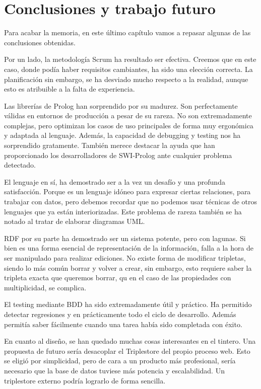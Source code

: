 \documentclass[12pt]{report} %
\begin{document}
\chapter{Conclusiones y trabajo futuro}

Para acabar la memoria, en este último capítulo vamos a repasar algunas de las conclusiones obtenidas.

Por un lado, la metodología Scrum ha resultado ser efectiva. Creemos que en este caso, donde podía haber requisitos cambiantes, ha sido una elección correcta. La planificación sin embargo, se ha desviado mucho respecto a la realidad, aunque esto es atribuible a la falta de experiencia.

Las librerías de Prolog han sorprendido por su madurez. Son perfectamente válidas en entornos de producción a pesar de su rareza. No son extremadamente complejas, pero optimizan los casos de uso principales de forma muy ergonómica y adaptada al lenguaje.  Además, la capacidad de debugging y testing nos ha sorprendido gratamente. También merece destacar la ayuda que han proporcionado los desarrolladores de SWI-Prolog ante cualquier problema detectado.

El lenguaje en sí, ha demostrado ser a la vez un desafío y una profunda satisfacción. Porque es un lenguaje idóneo para expresar ciertas relaciones, para trabajar con datos, pero debemos recordar que no podemos usar técnicas de otros lenguajes que ya están interiorizadas. Este problema de rareza también se ha notado al tratar de elaborar diagramas UML.

RDF por su parte ha demostrado ser un sistema potente, pero con lagunas. Si bien es una forma esencial de representación de la información, falla a la hora de ser manipulado para realizar ediciones. No existe forma de modificar tripletas, siendo lo más común borrar y volver a crear, sin embargo, esto requiere saber la tripleta exacta que queremos borrar, qu en el caso de las propiedades con multiplicidad, se complica.

El testing mediante BDD ha sido extremadamente útil y práctico. Ha permitido detectar regresiones y en prácticamente todo el ciclo de desarrollo. Además permitía saber fácilmente cuando una tarea había sido completada con éxito.

En cuanto al diseño, se han quedado muchas cosas interesantes en el tintero. Una propuesta de futuro sería desacoplar el Triplestore del propio proceso web. Esto se eligió por simplicidad, pero de cara a un producto más profesional, sería necesario que la base de datos tuviese más potencia y escalabilidad. Un triplestore externo podría lograrlo de forma sencilla.
\end{document}
